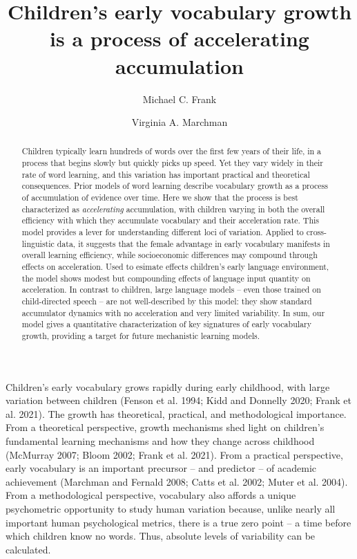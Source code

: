 \documentclass[
  11pt,
]{article}
\title{Children's early vocabulary growth is a process of accelerating
accumulation}
\author{Michael C. Frank \and Virginia A. Marchman}
\date{}
\begin{document}
\maketitle
\begin{abstract}
\noindent Children typically learn hundreds of words over the first few
years of their life, in a process that begins slowly but quickly picks
up speed. Yet they vary widely in their rate of word learning, and this
variation has important practical and theoretical consequences. Prior
models of word learning describe vocabulary growth as a process of
accumulation of evidence over time. Here we show that the process is
best characterized as \emph{accelerating} accumulation, with children
varying in both the overall efficiency with which they accumulate
vocabulary and their acceleration rate. This model provides a lever for
understanding different loci of variation. Applied to cross-linguistic
data, it suggests that the female advantage in early vocabulary
manifests in overall learning efficiency, while socioeconomic
differences may compound through effects on acceleration. Used to
esimate effects children's early language environment, the model shows
modest but compounding effects of language input quantity on
acceleration. In contrast to children, large language models -- even
those trained on child-directed speech -- are not well-described by this
model: they show standard accumulator dynamics with no acceleration and
very limited variability. In sum, our model gives a quantitative
characterization of key signatures of early vocabulary growth, providing
a target for future mechanistic learning models.
\end{abstract}


Children's early vocabulary grows rapidly during early childhood, with
large variation between children (Fenson et al. 1994; Kidd and Donnelly
2020; Frank et al. 2021). The growth has theoretical, practical, and
methodological importance. From a theoretical perspective, growth
mechanisms shed light on children's fundamental learning mechanisms and
how they change across childhood (McMurray 2007; Bloom 2002; Frank et
al. 2021). From a practical perspective, early vocabulary is an
important precursor -- and predictor -- of academic achievement
(Marchman and Fernald 2008; Catts et al. 2002; Muter et al. 2004). From
a methodological perspective, vocabulary also affords a unique
psychometric opportunity to study human variation because, unlike nearly
all important human psychological metrics, there is a true zero point --
a time before which children know no words. Thus, absolute levels of
variability can be calculated.
\end{document}
